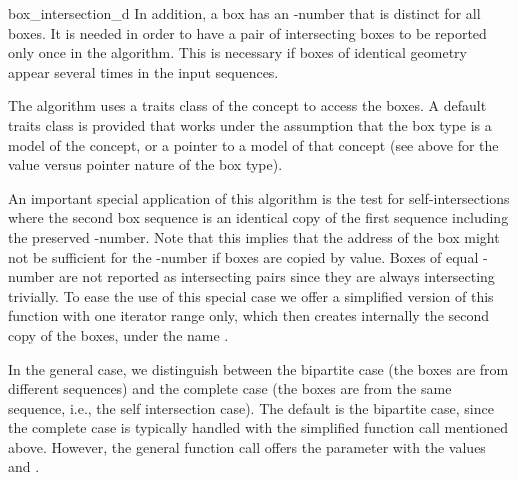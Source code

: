 \begin{ccRefFunction}{box_intersection_d}
In addition, a box has an  -number that is distinct for
all boxes. It is needed in order to have a pair of intersecting boxes
to be reported only once in the algorithm. This is necessary if boxes
of identical geometry appear several times in the input sequences.

The algorithm uses a traits class of the 
concept to access the boxes. A default traits class is provided that
works under the assumption that the box type is a model of the
 concept, or a pointer to a model of that
concept (see above for the value versus pointer nature of the box type).

An important special application of this algorithm is the test for
self-intersections where the second box sequence is an identical copy
of the first sequence including the preserved -number. Note
that this implies that the address of the box might not be sufficient
for the -number if boxes are copied by value. Boxes of equal
-number are not reported as intersecting pairs since they are
always intersecting trivially. To ease the use of this special case we
offer a simplified version of this function with one iterator range
only, which then creates internally the second copy of the boxes,
under the name .

In the general case, we distinguish between the bipartite case (the
boxes are from different sequences) and the complete case (the boxes
are from the same sequence, i.e., the self intersection case). The
default is the bipartite case, since the complete case is typically
handled with the simplified function call mentioned above. However,
the general function call offers the  parameter with the
values  and
.


 

\end{ccRefFunction}
